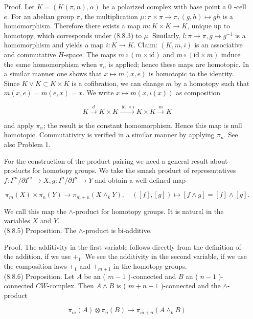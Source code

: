 \documentclass[10pt, letterpaper]{article}
\begin{document}
Proof. Let $K=(K(\pi, n), \alpha)$ be a polarized complex with base point a 0 -cell $e$. For an abelian group $\pi$, the multiplication $\mu: \pi \times \pi \rightarrow \pi,(g, h) \mapsto g h$ is a homomorphism. Therefore there exists a map $m: K \times K \rightarrow K$, unique up to homotopy, which corresponds under (8.8.3) to $\mu$. Similarly, $l: \pi \rightarrow \pi, g \mapsto g^{-1}$ is a homomorphism and yields a map $i: K \rightarrow K$. Claim: $(K, m, i)$ is an associative and commutative $H$-space. The maps $m \circ(m \times \mathrm{id})$ and $m \circ(\mathrm{id} \times m)$ induce the same homomorphism when $\pi_{n}$ is applied; hence these maps are homotopic. In a similar manner one shows that $x \mapsto m(x, e)$ is homotopic to the identity. Since $K \vee K \subset K \times K$ is a cofibration, we can change $m$ by a homotopy such that $m(x, e)=m(e, x)=x$. We write $x \mapsto m(x, i(x))$ as composition

$$
K \xrightarrow{d} K \times K \xrightarrow{\text { id } \times i} K \times K \xrightarrow{m} K
$$

and apply $\pi_{n}$; the result is the constant homomorphism. Hence this map is null homotopic. Commutativity is verified in a similar manner by applying $\pi_{n}$. See also Problem 1.

For the construction of the product pairing we need a general result about products for homotopy groups. We take the smash product of representatives $f: I^{m} / \partial I^{m} \rightarrow X, g: I^{n} / \partial I^{n} \rightarrow Y$ and obtain a well-defined map

$$
\pi_{m}(X) \times \pi_{n}(Y) \rightarrow \pi_{m+n}\left(X \wedge_{k} Y\right), \quad([f],[g]) \mapsto[f \wedge g]=[f] \wedge[g] .
$$

We call this map the $\wedge$-product for homotopy groups. It is natural in the variables $X$ and $Y$.\\
(8.8.5) Proposition. The $\wedge$-product is bi-additive.

Proof. The additivity in the first variable follows directly from the definition of the addition, if we use $+_{1}$. We see the additivity in the second variable, if we use the composition laws $+_{1}$ and $+_{m+1}$ in the homotopy groups.\\
(8.8.6) Proposition. Let $A$ be an ( $m-1$ )-connected and $B$ an ( $n-1$ )-connected $C W$-complex. Then $A \wedge B$ is ( $m+n-1$ )-connected and the $\wedge$-product

$$
\pi_{m}(A) \otimes \pi_{n}(B) \rightarrow \pi_{m+n}\left(A \wedge_{k} B\right)
$$
\end{document}
